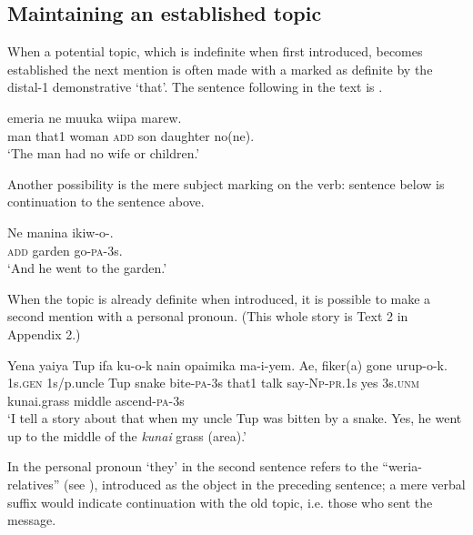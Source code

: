 \subsection{Maintaining an established topic}  \label{sec:9.2.2}

When a potential topic, which is indefinite when first introduced, becomes established the next mention is often made with a  marked as definite by the distal-1 demonstrative  `that'. The sentence  following  in the text is . 

\ea%
\label{ex:9:x1673}
\gll {}   emeria  ne  muuka  wiipa  marew.\\
man  that1  woman  \textsc{add}  son  daughter  no(ne).\\
\glt`The man had no wife or children.'
\z


Another possibility is the mere subject marking on the verb: sentence  below is continuation to the sentence  above. 

\ea%
\label{ex:9:x1674}
\gll Ne  manina  ikiw-o-. \\
\textsc{add}  garden  go-\textsc{pa}-3s.      \\
\glt`And he went to the garden.'
\z


When the topic is already definite when introduced, it is possible to make a second mention with a personal pronoun. (This whole story is Text 2 in Appendix 2.) 

\ea%
\label{ex:9:x1919}
\gll Yena  yaiya  Tup  ifa  ku-o-k  nain  opaimika ma-i-yem.  Ae,    fiker(a)  gone  urup-o-k. \\
1s.\textsc{gen}  1s/p.uncle  Tup  snake  bite-\textsc{pa}-3s  that1  talk say-\textsc{Np}-\textsc{pr}.1s  yes  3s.\textsc{unm}  kunai.grass  middle  ascend-\textsc{pa}-3s      \\
\glt`I tell a story about that when my uncle Tup was bitten by a snake. Yes, he went up to the middle of the \textit{kunai} grass (area).'
\z


In  the personal pronoun   `they' in the second sentence refers to the ``weria-relatives'' (see ), introduced as the object in the preceding sentence; a mere verbal suffix would indicate continuation with the old topic, i.e. those who sent the message. 

